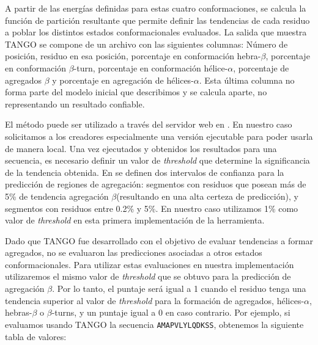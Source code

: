 A partir de las energías definidas para estas cuatro conformaciones, se calcula la función de partición resultante que permite definir las tendencias de cada residuo a poblar los distintos estados conformacionales evaluados.
La salida que muestra TANGO se compone de un archivo con las siguientes columnas:
Número de posición, residuo en esa posición, porcentaje en conformación hebra-$\beta$, porcentaje en conformación $\beta$-turn, porcentaje en conformación hélice-$\alpha$, porcentaje de agregados $\beta$ y
porcentaje en agregación de hélices-$\alpha$.
Esta última columna no forma parte del modelo inicial que describimos y se calcula aparte, no representando un resultado confiable.

El método puede ser utilizado a través del servidor web en \cite{tangoWeb}. En nuestro caso solicitamos a los creadores especialmente una versión ejecutable para poder usarla de manera local.
Una vez ejecutados y obtenidos los resultados para una secuencia, es necesario definir un valor de \textit{threshold} que determine la significancia de la tendencia obtenida.
En \cite{fernandez2004prediction} se definen dos intervalos de confianza para la predicción de regiones de agregación: segmentos con residuos que posean más de 5\% de tendencia agregación $\beta$(resultando en una alta certeza de predicción),
y segmentos con residuos entre 0.2\% y 5\%. En nuestro caso utilizamos 1\% como valor de \textit{threshold} en esta primera implementación de la herramienta.

Dado que TANGO fue desarrollado con el objetivo de evaluar tendencias a formar agregados, no se evaluaron las predicciones asociadas a otros estados conformacionales. 
Para utilizar estas evaluaciones en nuestra implementación utilizaremos el mismo valor de \textit{threshold} que se obtuvo para la predicción de agregación $\beta$. 
Por lo tanto, el puntaje será igual a 1 cuando el residuo tenga una tendencia superior al valor de \textit{threshold} para la formación de agregados, hélices-$\alpha$, hebras-$\beta$ o $\beta$-turns, 
y un puntaje igual a 0 en caso contrario.
Por ejemplo, si evaluamos usando TANGO la secuencia \texttt{AMAPVLYLQDKSS}, obtenemos la siguiente tabla de valores:

